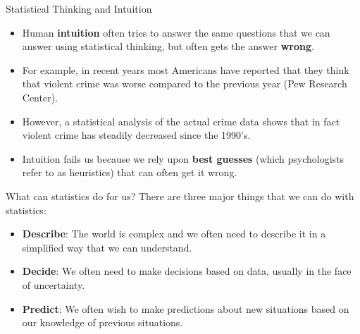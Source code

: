 \documentclass[handout]{beamer}
\begin{document}
\begin{frame}{Statistical Thinking and Intuition}

\scriptsize{
\begin{itemize}
\item Human \textbf{intuition} often tries to answer the same questions that we can answer using statistical thinking, but often gets the answer \textbf{wrong}. 
\item For example, in recent years most Americans have reported that they think that violent crime was worse compared to the previous year (Pew Research Center). 
\item However, a statistical analysis of the actual crime data shows that in fact violent crime has steadily decreased since the 1990’s. 
\item Intuition fails us because we rely upon \textbf{best guesses} (which psychologists refer to as heuristics) that can often get it wrong. \cite{poldrack2019statistical}

\end{itemize}

}
 
\end{frame}





\begin{frame}{What can statistics do for us?}
There are three major things that we can do with statistics:

\begin{itemize}
\item \textbf{Describe}: The world is complex and we often need to describe it in a simplified way that we can understand.
\item \textbf{Decide}: We often need to make decisions based on data, usually in the face of uncertainty.
\item \textbf{Predict}: We often wish to make predictions about new situations based on our knowledge of previous situations.



\end{itemize}


 
\end{frame}
\end{document}
